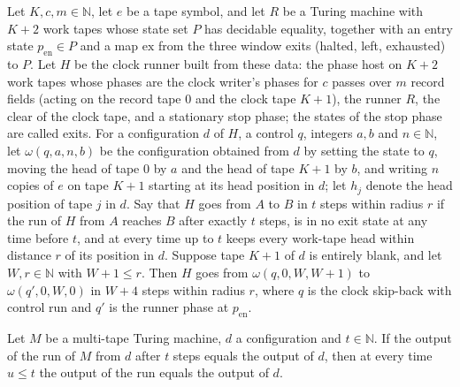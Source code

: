 \begin{lemma}
\label{Turing.cw_seg_clockBack}
\leanok
{}
Let $K,c,m\in\mathbb{N}$, let $e$ be a tape symbol, and let $R$ be a Turing machine with $K+2$
work tapes whose state set $P$ has decidable equality, together with an entry state
$p_{\mathrm{en}}\in P$ and a map $\mathrm{ex}$ from the three window exits (halted, left,
exhausted) to $P$. Let $H$ be the clock runner built from these data: the phase host on $K+2$
work tapes whose phases are the clock writer's phases for $c$ passes over $m$ record fields
(acting on the record tape $0$ and the clock tape $K+1$), the runner $R$, the clear of the
clock tape, and a stationary stop phase; the states of the stop phase are called exits. For a
configuration $d$ of $H$, a control $q$, integers $a,b$ and $n\in\mathbb{N}$, let
$\omega(q,a,n,b)$ be the configuration obtained from $d$ by setting the state to $q$, moving
the head of tape $0$ by $a$ and the head of tape $K+1$ by $b$, and writing $n$ copies of $e$ on
tape $K+1$ starting at its head position in $d$; let $h_j$ denote the head position of tape $j$
in $d$. Say that $H$ goes from $A$ to $B$ in $t$ steps within radius $r$ if the run of $H$ from
$A$ reaches $B$ after exactly $t$ steps, is in no exit state at any time before $t$, and at
every time up to $t$ keeps every work-tape head within distance $r$ of its position in $d$.
Suppose tape $K+1$ of $d$ is entirely blank, and let $W,r\in\mathbb{N}$ with $W+1\le r$. Then
$H$ goes from $\omega(q,0,W,W+1)$ to $\omega(q',0,W,0)$ in $W+4$ steps within radius $r$, where
$q$ is the clock skip-back with control run and $q'$ is the runner phase at $p_{\mathrm{en}}$.
\end{lemma}

\begin{lemma}
\label{Turing.cw_silence}
\leanok
{}
Let $M$ be a multi-tape Turing machine, $d$ a configuration and $t\in\mathbb{N}$. If the output
of the run of $M$ from $d$ after $t$ steps equals the output of $d$, then at every time $u\le
t$ the output of the run equals the output of $d$.
\end{lemma}

